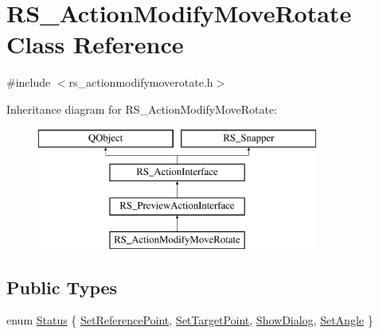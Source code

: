 \hypertarget{classRS__ActionModifyMoveRotate}{\section{R\-S\-\_\-\-Action\-Modify\-Move\-Rotate Class Reference}
\label{classRS__ActionModifyMoveRotate}
}


{\ttfamily \#include $<$rs\-\_\-actionmodifymoverotate.\-h$>$}

Inheritance diagram for R\-S\-\_\-\-Action\-Modify\-Move\-Rotate\-:\begin{figure}[H]
\begin{center}
\leavevmode
\includegraphics[height=4.000000cm]{classRS__ActionModifyMoveRotate}
\end{center}
\end{figure}
\subsection*{Public Types}
\begin{DoxyCompactItemize}
\item 
enum \hyperlink{classRS__ActionModifyMoveRotate_a1dc47c61849d0a85cf1fa25ae9c1e88b}{Status} \{ \hyperlink{classRS__ActionModifyMoveRotate_a1dc47c61849d0a85cf1fa25ae9c1e88ba9deb6184f7ae18a466622512ecf647c1}{Set\-Reference\-Point}, 
\hyperlink{classRS__ActionModifyMoveRotate_a1dc47c61849d0a85cf1fa25ae9c1e88bac4b1c40afe6b3db9ce4702d64f619bfa}{Set\-Target\-Point}, 
\hyperlink{classRS__ActionModifyMoveRotate_a1dc47c61849d0a85cf1fa25ae9c1e88ba78b81848dc59456f39bc6aaf5fedaf80}{Show\-Dialog}, 
\hyperlink{classRS__ActionModifyMoveRotate_a1dc47c61849d0a85cf1fa25ae9c1e88babdb99e3fb1ad8931ebf12d6f29f83408}{Set\-Angle}
 \}
\end{DoxyCompactItemize}
